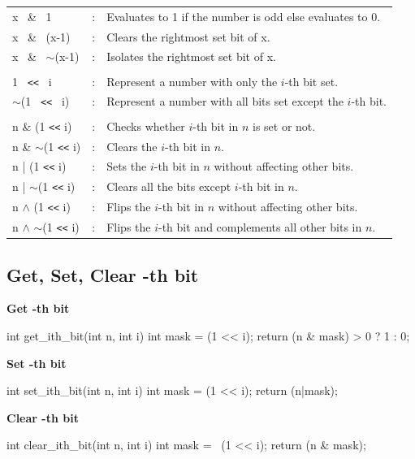 \documentclass{report}
\begin{document}
\begin{tabular}{lll}
   x \ \& \ 1 & : &
   Evaluates to 1 if the number is odd else evaluates to 0.
   \\
   x \ \& \ (x-1) & : & Clears the rightmost set bit of x.
   \\
   x \ \& \ $\sim$(x-1) & : &
   Isolates the rightmost set bit of x.
   \\
   \\
   1 \ \texttt{<<} \ i & : & Represent a number with only the $i$-th bit set.
   \\
   $\sim$(1 \ \texttt{<<} \ i) & : & Represent a number with all bits set except the $i$-th bit.
   \\
   \\
   n \& (1 \texttt{<<} i) & : & Checks whether $i$-th bit  in $n$ is set or not.
   \\
   n \& $\sim$(1 \texttt{<<} i) & : & Clears the $i$-th bit in $n$.
   \\
   n | (1 \texttt{<<} i) & : & Sets the $i$-th bit  in $n$ without affecting other bits.
   \\
   n | $\sim$(1 \texttt{<<} i) & : & Clears all the bits except $i$-th bit in $n$.
   \\
   n $\wedge$ (1 \texttt{<<} i) & : & Flips the $i$-th bit in $n$ without affecting other bits.
   \\
   n $\wedge$ $\sim$(1 \texttt{<<} i) & : & Flips the $i$-th bit and complements all other bits in $n$.
   \\
\end{tabular}


\subsection{Get, Set, Clear -th bit}

\textbf{Get -th bit}
\begin{code}[language=C++]
   int get_ith_bit(int n, int i){
      int mask = (1 << i);
      return (n & mask) > 0 ? 1 : 0;
   }
\end{code}


\pagebreak
\textbf{Set -th bit}
\begin{code}[language=C++]
   int set_ith_bit(int n, int i){
      int mask = (1 << i);
      return (n|mask);
   }
\end{code}


\textbf{Clear -th bit}
\begin{code}[language=C++]
   int clear_ith_bit(int n, int i){
      int mask = ~(1 << i);
      return (n & mask);
   }
\end{code}
\end{document}
